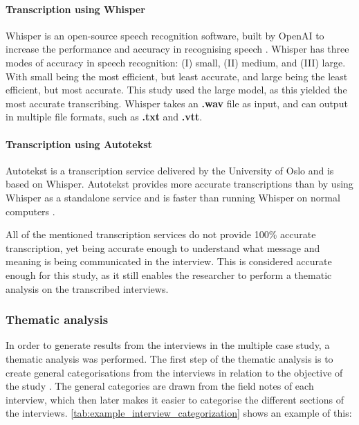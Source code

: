 \paragraph{Transcription using Whisper}
Whisper is an open-source speech recognition software, built by OpenAI to increase the performance and accuracy in recognising speech \cite{oa_2022}. Whisper has three modes of accuracy in speech recognition: (I) small, (II) medium, and (III) large. With small being the most efficient, but least accurate, and large being the least efficient, but most accurate. This study used the large model, as this yielded the most accurate transcribing. Whisper takes an \textbf{.wav} file as input, and can output in multiple file formats, such as \textbf{.txt} and \textbf{.vtt}.

\paragraph{Transcription using Autotekst}
Autotekst is a transcription service delivered by the University of Oslo and is based on Whisper. Autotekst provides more accurate transcriptions than by using Whisper as a standalone service and is faster than running Whisper on normal computers \cite{autotekst_2023}.

All of the mentioned transcription services do not provide 100\% accurate transcription, yet being accurate enough to understand what message and meaning is being communicated in the interview. This is considered accurate enough for this study, as it still enables the researcher to perform a thematic analysis on the transcribed interviews.

\subsubsection{Thematic analysis}
In order to generate results from the interviews in the multiple case study, a thematic analysis was performed. The first step of the thematic analysis is to create general categorisations from the interviews in relation to the objective of the study \cite{bjo_2022}. The general categories are drawn from the field notes of each interview, which then later makes it easier to categorise the different sections of the interviews. \autoref{tab:example_interview_categorization} shows an example of this:

